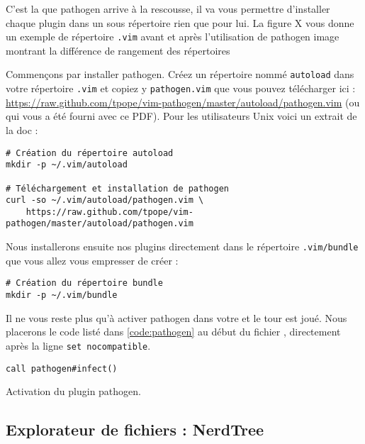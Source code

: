 C'est la que pathogen arrive à la rescousse, il va vous permettre d'installer chaque plugin dans un sous répertoire rien que pour lui. La figure X vous donne un exemple de répertoire \Verb|.vim| avant et après l'utilisation de pathogen \TODO image montrant la différence de rangement des répertoires


Commençons par installer pathogen. Créez un répertoire nommé \Verb|autoload| dans votre répertoire \Verb|.vim| et copiez y \Verb|pathogen.vim| que vous pouvez télécharger ici : \url{https://raw.github.com/tpope/vim-pathogen/master/autoload/pathogen.vim} (ou qui vous a été fourni avec ce PDF). Pour les utilisateurs Unix voici un extrait de la doc  :

\begin{verbatim}
# Création du répertoire autoload
mkdir -p ~/.vim/autoload 

# Téléchargement et installation de pathogen
curl -so ~/.vim/autoload/pathogen.vim \
    https://raw.github.com/tpope/vim-pathogen/master/autoload/pathogen.vim
\end{verbatim}

Nous installerons ensuite nos plugins directement dans le répertoire \Verb|.vim/bundle| que vous allez vous empresser de créer :

\begin{verbatim}
# Création du répertoire bundle
mkdir -p ~/.vim/bundle
\end{verbatim}

Il ne vous reste plus qu'à activer pathogen dans votre \vimrc et le tour est joué. Nous placerons le code listé dans 
\ref{code:pathogen} au début du fichier \vimrc, directement après la ligne \Verb|set nocompatible|.

\begin{listing}[H]

\begin{verbatim}
call pathogen#infect()
\end{verbatim}
\caption{Activation du plugin pathogen.}
\label{code:pathogen}
\end{listing}


\subsection{Explorateur de fichiers : NerdTree}

\TODO
